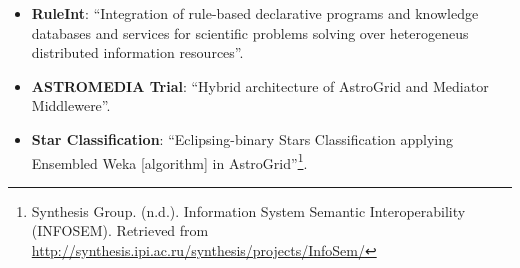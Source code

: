 \begin{itemize}
\item \textbf{RuleInt}:
``Integration of rule-based declarative programs and knowledge databases and
services for scientific problems solving over heterogeneus distributed
information resources''.

\item \textbf{ASTROMEDIA Trial}:
``Hybrid architecture of AstroGrid and Mediator Middlewere''.

\item \textbf{Star Classification}:
``Eclipsing-binary Stars Classification applying Ensembled Weka [algorithm] in
AstroGrid''\footnote{Synthesis Group. (n.d.). Information System Semantic
Interoperability (INFOSEM). Retrieved from
\url{http://synthesis.ipi.ac.ru/synthesis/projects/InfoSem/}}.

\end{itemize}


